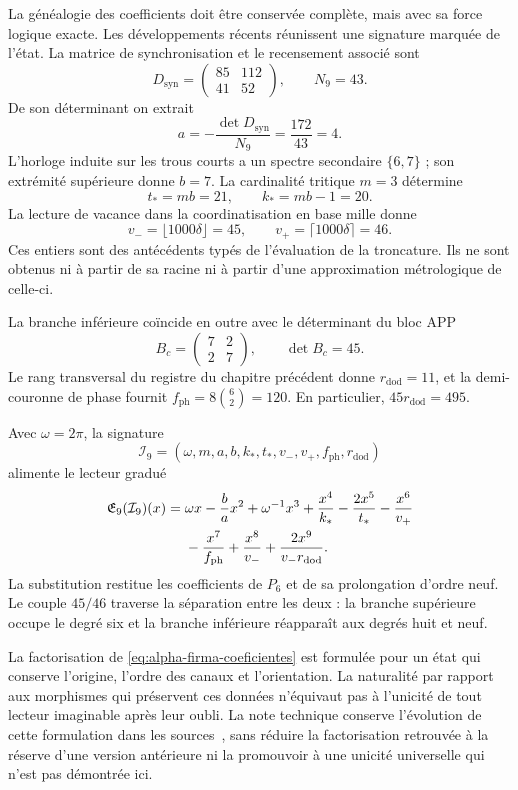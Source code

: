 La généalogie des coefficients doit être conservée complète, mais avec sa
force logique exacte. Les développements récents réunissent une signature marquée
de l'état. La matrice de synchronisation et le recensement associé sont
\[
 D_{\mathrm{syn}}=\begin{pmatrix}85&112\\41&52\end{pmatrix},
 \qquad N_9=43.
\]
De son déterminant on extrait
\[
 a=-\frac{\det D_{\mathrm{syn}}}{N_9}
   =\frac{172}{43}=4.
\]
L'horloge induite sur les trous courts a un spectre secondaire \(\{6,7\}\) ; son extrémité supérieure donne \(b=7\). La cardinalité tritique \(m=3\) détermine
\[
 t_*=mb=21,\qquad k_*=mb-1=20.
\]
La lecture de vacance dans la coordinatisation en base mille donne
\[
 v_-=\lfloor1000\delta\rfloor=45,\qquad
 v_+=\lceil1000\delta\rceil=46.
\]
Ces entiers sont des antécédents typés de l'évaluation de la troncature. Ils ne sont obtenus ni à partir de sa racine ni à partir d'une approximation métrologique de celle-ci.

La branche inférieure coïncide en outre avec le déterminant du bloc APP
\[
 B_c=\begin{pmatrix}7&2\\2&7\end{pmatrix},\qquad\det B_c=45.
\]
Le rang transversal du registre du chapitre précédent donne
\(r_{\mathrm{dod}}=11\), et la demi-couronne de phase fournit
\(f_{\mathrm{ph}}=8\binom62=120\). En particulier,
\(45r_{\mathrm{dod}}=495\).

Avec \(\omega=2\pi\), la signature
\[
 \mathcal I_9=(\omega,m,a,b,k_*,t_*,v_-,v_+,f_{\mathrm{ph}},r_{\mathrm{dod}})
\]
alimente le lecteur gradué
\begin{align}
 \mathfrak E_9(\mathcal I_9)(x)
 ={}&\omega x-\frac ba x^2+\omega^{-1}x^3
 +\frac{x^4}{k_*}-\frac{2x^5}{t_*}-\frac{x^6}{v_+}\notag\\
 &-\frac{x^7}{f_{\mathrm{ph}}}+\frac{x^8}{v_-}
 +\frac{2x^9}{v_-r_{\mathrm{dod}}}.
 \label{eq:alpha-firma-coeficientes}
\end{align}
La substitution restitue les coefficients de \(P_6\) et de sa
prolongation d'ordre neuf. Le couple \(45/46\) traverse la séparation
entre les deux : la branche supérieure occupe le degré six et la branche inférieure réapparaît
aux degrés huit et neuf.

La factorisation de \eqref{eq:alpha-firma-coeficientes} est formulée
pour un état qui conserve l’origine, l’ordre des canaux et l’orientation. La
naturalité par rapport aux morphismes qui préservent ces données n’équivaut pas à
l’unicité de tout lecteur imaginable après leur oubli. La note
technique conserve l’évolution de cette formulation dans les sources~\cite{hmtholonomia},
sans réduire la factorisation retrouvée à la réserve d’une version
antérieure ni la promouvoir à une unicité universelle qui n’est pas
démontrée ici.

